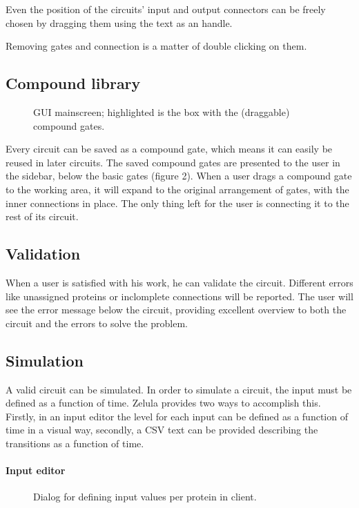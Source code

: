 Even the position of the circuits' input and output connectors can be freely chosen by dragging them using the text as an handle.

Removing gates and connection is a matter of double clicking on them.

\subsection{Compound library}
\begin{figure}[h!]
\centering{}
\caption{GUI mainscreen; highlighted is the box with the (draggable) compound gates.}
\end{figure}

\noindent Every circuit can be saved as a compound gate, which means it can easily be reused in later circuits. The saved compound gates are presented to the user in the sidebar, below the basic gates (figure 2). When a user drags a compound gate to the working area, it will expand to the original arrangement of gates, with the inner connections in place. The only thing left for the user is connecting it to the rest of its circuit.

\subsection{Validation}
When a user is satisfied with his work, he can validate the circuit. Different errors like unassigned proteins or inclomplete connections will be reported. The user will see the error message below the circuit, providing excellent overview to both the circuit and the errors to solve the problem.

\subsection{Simulation}
A valid circuit can be simulated. In order to simulate a circuit, the input must be defined as a function of time. Zelula provides two ways to accomplish this. Firstly, in an input editor the level for each input can be defined as a function of time in a visual way, secondly, a CSV text can be provided describing the transitions as a function of time.

\paragraph{Input editor}
\begin{figure}[h!]
\centering{}
\caption{Dialog for defining input values per protein in client.}
\end{figure}


